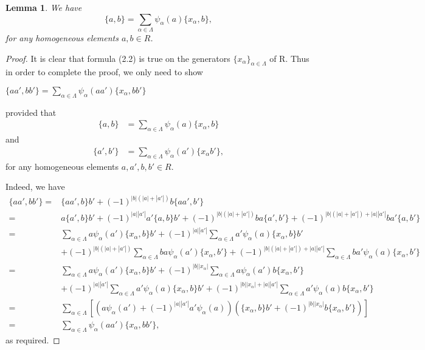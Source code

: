 \documentclass[a4paper,10pt]{amsart}
\newtheorem{lemma}[theorem]{Lemma}
\theoremstyle{definition}
\theoremstyle{remark}
\numberwithin{equation}{section}
\begin{document}
\begin{lemma}\label{lem2.11}
We have
\begin{equation}
\{a, b\}=\sum_{\alpha\in \Lambda}\psi_{\alpha}(a)\{x_{\alpha}, b\},
\end{equation}
for any homogeneous elements $a, b\in R$.
\end{lemma}

\begin{proof}
It is clear that formula (2.2) is true on the generators
$\{x_{\alpha}\}_{\alpha\in \Lambda}$ of R. Thus in order to complete
the proof, we only need to show
\begin{center}
$\{aa', bb'\}=\sum_{\alpha\in
\Lambda}\psi_{\alpha}(aa')\{x_{\alpha}, bb'\}$
\end{center}
 provided that
\begin{align*}
\{a, b\}&=\sum_{\alpha\in \Lambda}\psi_{\alpha}(a)\{x_{\alpha}, b\}
\end{align*}
and
\begin{align*}
\{a', b'\}&=\sum_{\alpha\in \Lambda}\psi_{\alpha}(a')\{x_{\alpha}
b'\},
\end{align*}
for any homogeneous elements $a, a', b, b'\in R$.

Indeed, we have
\begin{equation}
\begin{split}
\{aa', bb'\}=&\{aa', b\}b'+(-1)^{|b|(|a|+|a'|)}b\{aa', b'\}\\
=&a\{a', b\}b'+(-1)^{|a||a'|}a'\{a, b\}b'+(-1)^{|b|(|a|+|a'|)}ba\{a', b'\}+(-1)^{|b|(|a|+|a'|)+|a||a'|}ba'\{a, b'\}\\
=&\sum_{\alpha\in \Lambda}a\psi_{\alpha}(a')\{x_{\alpha},
b\}b'+(-1)^{|a||a'|}\sum_{\alpha\in \Lambda}a'\psi_{\alpha}(a)\{x_{\alpha}, b\}b'\\
&+(-1)^{|b|(|a|+|a'|)}\sum_{\alpha\in
\Lambda}ba\psi_{\alpha}(a')\{x_{\alpha}, b'\}+(-1)^{|b|(|a|+|a'|)+|a||a'|}\sum_{\alpha\in \Lambda}ba'\psi_{\alpha}(a)\{x_{\alpha}, b'\}\\
=&\sum_{\alpha\in \Lambda}a\psi_{\alpha}(a')\{x_{\alpha},
b\}b'+(-1)^{|b||x_{\alpha}|}\sum_{\alpha\in \Lambda}a\psi_{\alpha}(a')b\{x_{\alpha}, b'\}\\
&+(-1)^{|a||a'|}\sum_{\alpha\in
\Lambda}a'\psi_{\alpha}(a)\{x_{\alpha},
b\}b'+(-1)^{|b||x_{\alpha}|+|a||a'|}\sum_{\alpha\in \Lambda}a'\psi_{\alpha}(a)b\{x_{\alpha}, b'\}\\
=&\sum_{\alpha\in
\Lambda}[(a\psi_{\alpha}(a')+(-1)^{|a||a'|}a'\psi_{\alpha}(a))(\{x_{\alpha},
b\}b'+(-1)^{|b||x_{\alpha}|}b\{x_{\alpha}, b'\})]\\
=&\sum_{\alpha\in \Lambda}\psi_{\alpha}(aa')\{x_{\alpha}, bb'\},
\end{split}\nonumber
\end{equation}
as required.
\end{proof}
\end{document}
